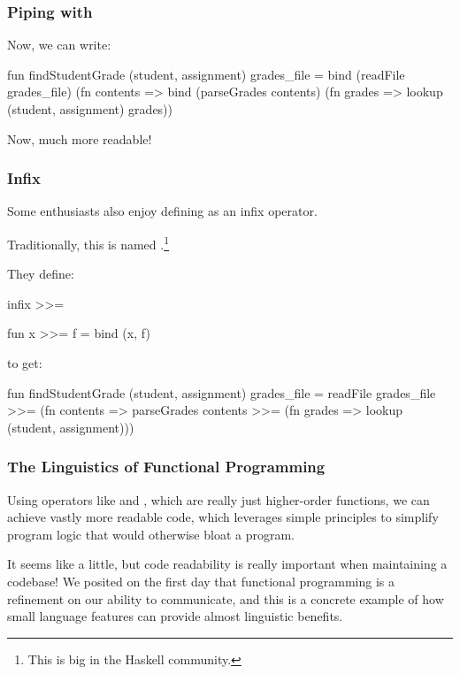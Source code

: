 \documentclass[aspectratio=169]{beamer}
\begin{document}
\begin{frame}[fragile]
  \frametitle{Piping with }

  Now, we can write:

  \pause
  \begin{codeblock}
    fun findStudentGrade (student, assignment) grades_file =
      bind (readFile grades_file) (fn contents =>
      bind (parseGrades contents) (fn grades =>
      lookup (student, assignment) grades))
  \end{codeblock}

  \pause
  \vspace{\fill}

  Now, much more readable!
\end{frame}

\begin{frame}[fragile]
  \frametitle{Infix }

  Some enthusiasts also enjoy defining  as an infix operator.

  \pause
  \vspace{\fill}

  Traditionally, this is named \code{>>=}.\footnote{This is big in the Haskell community.}

  \pause
  \vspace{\fill}

  They define:
  \begin{codeblock}
    infix >>=

    fun x >>= f = bind (x, f)
  \end{codeblock}

  \pause
  \vspace{\fill}

  to get:
  \begin{codeblock}
    fun findStudentGrade (student, assignment) grades_file =
      readFile grades_file >>= (fn contents =>
      parseGrades contents >>= (fn grades =>
      lookup (student, assignment)))
  \end{codeblock}
\end{frame}

\begin{frame}[fragile]
  \frametitle{The Linguistics of Functional Programming}

  Using operators like \code{>>=} and \code{|>}, which are really just
  higher-order functions, we can achieve vastly more readable code, which
  leverages simple principles to simplify program logic that would
  otherwise bloat a program.

  \pause
  \vspace{\fill}

  It seems like a little, but code readability is really important when
  maintaining a codebase! We posited on the first day that functional
  programming is a refinement on our ability to communicate, and this is
  a concrete example of how small language features can provide almost
  linguistic benefits.
\end{frame}
\end{document}
